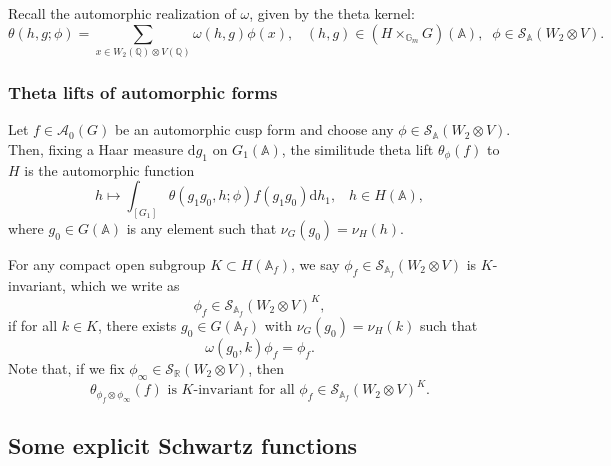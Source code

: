\documentclass[12pt]{amsart}
\def\bA{\mathbb{A}}
\theoremstyle{definition}
\newcommand{\Q}{\mathbb{Q}}
\newcommand{\R}{\mathbb{R}}
\renewcommand{\d}{\mathrm{d}}
\begin{document}
Recall the automorphic realization of $\omega$, given by the theta kernel:
 \begin{equation}
     \theta (h,g;\phi) =\sum_{x\in W_2(\Q)\otimes V(\Q)}\omega(h,g)\phi (x),\;\; \;(h,g)\in (H\times_{\mathbb G_m} G)(\bA), \;\;\phi\in\mathcal S_{\bA}(W_2\otimes V).  
 \end{equation}

\subsubsection{Theta lifts of automorphic forms} \label{appendix global theta lift subsubsec}
Let $f\in\mathcal A_0 (G) $ be an automorphic cusp form and choose any $\phi\in\mathcal S_{\bA} (W_2\otimes  V)$. Then, fixing a Haar measure $\d g_1 $
 on $G_1 (\bA) $, the similitude theta lift $\theta_\phi(f)$  to $H$ is the automorphic function
 \begin{equation}\label{eq: glopbal theta lift def}
     h\mapsto \int_{[G_1]} \theta(g_1g_0,h; \phi) {f (g_1g_0)}\d h_1, \;\;\; h\in H({\bA}),
 \end{equation}
 where $g_0\in G({\bA})$ is any element such that $\nu_G(g_0) = \nu_H(h).$ 

 For any compact open subgroup $K \subset H(\bA_f)$, we say $\phi_f\in \mathcal S_{\bA_f} (W_2\otimes V)$ is $K$-invariant, which we write as $$\phi_f\in  \mathcal S_{\bA_f} (W_2\otimes V)^K,$$ if for all $k\in K$, there exists $g_0 \in G(\bA_f)$ with $\nu_G(g_0) = \nu_H(k)$ such that $$\omega(g_0, k) \phi_f = \phi_f.$$ Note that, if we fix $\phi_\infty\in \mathcal S_\R(W_2\otimes V)$, then 
 \begin{equation}
     \theta_{\phi_f\otimes\phi_\infty} (f)\textrm{ is $K$-invariant for all }\phi_f\in \mathcal S_{\bA_f} (W_2\otimes V)^K.
 \end{equation}
\subsection{Some explicit Schwartz functions}\label{appendix section explicit schwartz}
\end{document}
